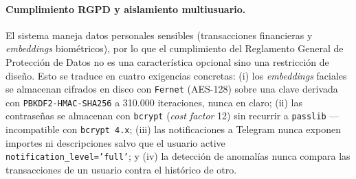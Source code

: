 \paragraph{Cumplimiento RGPD y aislamiento multiusuario.} El sistema
maneja datos personales sensibles (transacciones financieras y
\textit{embeddings} biométricos), por lo que el cumplimiento del
Reglamento General de Protección de Datos no es una característica
opcional sino una restricción de diseño. Esto se traduce en cuatro
exigencias concretas: (i) los \textit{embeddings} faciales se
almacenan cifrados en disco con \texttt{Fernet} (AES-128) sobre una
clave derivada con \texttt{PBKDF2-HMAC-SHA256} a 310.000 iteraciones,
nunca en claro; (ii) las contraseñas se almacenan con \texttt{bcrypt}
(\textit{cost factor} 12) sin recurrir a \texttt{passlib} ---
incompatible con \texttt{bcrypt 4.x}; (iii) las notificaciones a
Telegram nunca exponen importes ni descripciones salvo que el
usuario active \texttt{notification\_level='full'}; y (iv) la
detección de anomalías nunca compara las transacciones de un usuario
contra el histórico de otro.

